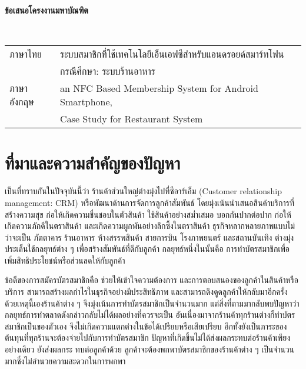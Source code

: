 \documentclass[a4paper]{article}
\begin{document}
\clearpage

\begin{center}
{\huge \bf ข้อเสนอโครงงานมหาบัณฑิต}
\end{center}

 \\

\Large{\noindent\hspace{0.7cm}\setlength{\tabcolsep}{15pt}
\begin{tabular}{l l}    
	ภาษาไทย 		& ระบบสมาชิกที่ใช้เทคโนโลยีเอ็นเอฟซีสำหรับแอนดรอยด์สมาร์ทโฟน  \\
				& กรณีศึกษา: ระบบร้านอาหาร \\
	ภาษาอังกฤษ	& an NFC Based Membership System for Android Smartphone,  \\
				& Case Study for Restaurant System \\    
\end{tabular}
}

\section{ที่มาและความสำคัญของปัญหา}
เป็นที่ทราบกันในปัจจุบันนี้ว่า ร้านค้าส่วนใหญ่ต่างมุ่งไปที่ซีอาร์เอ็ม (Customer relationship management: CRM) หรือพัฒนาด้านการจัดการลูกค้าสัมพันธ์ โดยมุ่งเน้นนำเสนอสินค้าบริการที่สร้างความสุข ก่อให้เกิดความชื่นชอบในตัวสินค้า ใช้สินค้าอย่างสม่ำเสมอ บอกกันปากต่อปาก ก่อให้เกิดความภักดีในตราสินค้า และเกิดความผูกพันอย่างลึกซึ้งในตราสินค้า ธุรกิจหลากหลายภาพแบบไม่ว่าจะเป็น ภัตตาคาร ร้านอาหาร ห้างสรรพสินค้า สายการบิน โรงภาพยนตร์ และสถานบันเทิง ต่างมุ่งประเด็นใช้กลยุทธ์ต่าง ๆ เพื่อสร้างสัมพันธ์ที่ดีกับลูกค้า กลยุทธ์หนึ่งในนั้นคือ การทำบัตรสมาชิกเพื่อเพิ่มสิทธิประโยชน์หรือส่วนลดให้กับลูกค้า

ข้อดีของการสมัครบัตรสมาชิกคือ ช่วยให้เข้าใจความต้องการ และการตอบสนองของลูกค้าในสินค้าหรือบริการ สามารถสร้างผลกําไรในธุรกิจอย่างมีประสิทธิภาพ และสามารถดึงดูดลูกค้าให้กลับมาอีกครั้ง ด้วยเหตุนี้เองร้านค้าต่าง ๆ จึงมุ่งเน้นการทำบัตรสมาชิกเป็นจำนวนมาก แต่สิ่งที่ตามมากลับพบปัญหาว่ากลยุทธ์การทำตลาดดังกล่าวกลับไม่ได้ผลอย่างที่ควรจะเป็น อันเนื่องมาจากร้านค้าทุกร้านต่างก็ทำบัตรสมาชิกเป็นของตัวเอง จึงไม่เกิดความแตกต่างในข้อได้เปรียบหรือเสียเปรียบ อีกทั้งยังเป็นภาระของต้นทุนที่ทุกร้านจะต้องจ่ายไปกับการทำบัตรสมาชิก ปัญหาที่เกิดขึ้นไม่ได้ส่งผลกระทบต่อร้านค้าเพียงอย่างเดียว  ยังส่งผลกระ \newline ทบต่อลูกค้าด้วย ลูกค้าจะต้องพกพาบัตรสมาชิกของร้านค้าต่าง ๆ เป็นจำนวนมากซึ่งไม่อำนวยความสะดวกในการพกพา
\end{document}
